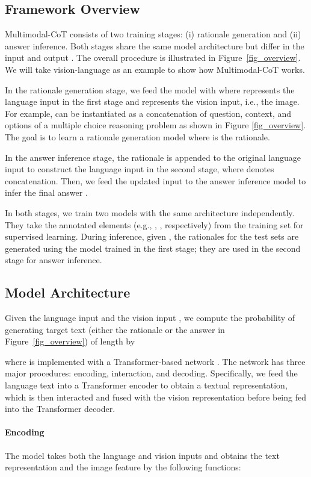 \documentclass[nohyperref]{article}
\theoremstyle{plain}
\theoremstyle{definition}
\theoremstyle{remark}
\begin{document}
\subsection{Framework Overview}
Multimodal-CoT consists of two training stages: (i) rationale generation and (ii) answer inference. Both stages share the same model architecture but differ in the input  and output . The overall procedure is illustrated in Figure~\ref{fig_overview}. We will take vision-language as an example to show how Multimodal-CoT works.

In the rationale generation stage, we feed the model with  where  represents the language input in the first stage and  represents the vision input, i.e., the image. For example,  can be instantiated as a concatenation of question, context, and options of a multiple choice reasoning problem \citep{lu2022learn} as shown in Figure \ref{fig_overview}. The goal is to learn a rationale generation model  where  is the rationale.

In the answer inference stage, the rationale  is appended to the original language input  to construct the language input in the second stage,  where  denotes concatenation. Then, we feed the updated input  to the answer inference model to infer the final answer .

{In both stages, we train two models with the same architecture independently.} They take the annotated elements (e.g., , , respectively) from the training set for supervised learning. During inference, given , the rationales for the test sets are generated using the model trained in the first stage; they are used in the second stage for answer inference.

\subsection{Model Architecture}
Given the language input  and the vision input , we compute the probability of generating target text  (either the rationale or the answer in Figure~\ref{fig_overview}) of length  by

where  is implemented with a Transformer-based network \citep{vaswani2017attention}. The network has three major procedures: encoding, interaction, and decoding. Specifically, we feed the language text into a Transformer encoder to obtain a textual representation, which is then interacted and fused with the vision representation before being fed into the Transformer decoder.

\paragraph{Encoding} The model  takes both the language and vision inputs and obtains the text representation  and the image feature  by the following functions:
\end{document}
